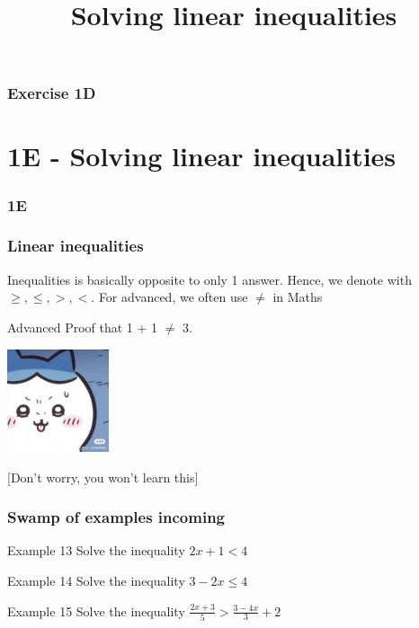 \documentclass{beamer}
\begin{document}
\begin{frame}
    \frametitle{Exercise 1D}
\end{frame}


\section{1E - Solving linear inequalities}
\begin{frame}
    \frametitle{1E}
    \begin{center}
        \title{Solving linear inequalities}
        \maketitle
    \end{center}
\end{frame}

\begin{frame}
    \frametitle{Linear inequalities}
    Inequalities is basically opposite to only 1 answer. Hence, we denote with $\geq, \leq, >, <$. For advanced, 
    we often use $\neq$ in Maths
    \begin{block}{Advanced}
        Proof that 1 + 1 $\neq$ 3.
        \begin{center}
            \includegraphics[width = 3cm]{Worry.png}
        \end{center}
    \end{block}
    [Don't worry, you won't learn this]
\end{frame}

\begin{frame}[t]
    \frametitle{Swamp of examples incoming}
    \begin{block}{Example 13}
        Solve the inequality $2x + 1 <4$
    \end{block}
    \begin{block}{Example 14}
        Solve the inequality $3 -2x \leq 4$
    \end{block}
    \begin{block}{Example 15}
        Solve the inequality $\frac{2x+3}{5} > \frac{3-4x}{3} +2$
    \end{block}
\end{frame}
\begin{frame}
\end{frame}
\end{document}
